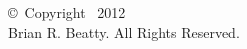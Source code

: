 \vspace*{\fill}

\begin{center}

\copyright\ Copyright \monthname\ 2012\\
Brian R. Beatty. All Rights Reserved.

\end{center}

\vspace*{\fill}